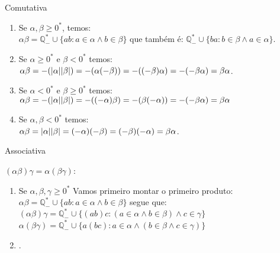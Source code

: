 \documentclass[../main.tex]{subfiles}
\begin{document}
\begin{prop}
    Comutativa
\end{prop}
\begin{dem}

    \begin{enumerate}
        \item Se $\alpha, \beta \geq 0^*$, temos: \\
        $\alpha \beta = \mathbb{Q}_{-}^* \cup \{ ab : a \in \alpha \land b \in \beta \}$ que também é:
        $\mathbb{Q}_{-}^* \cup \{ ba: b \in \beta \land a \in \alpha \}$.
    
    
        \item Se $\alpha \geq 0^*$ e $\beta < 0^*$ temos: \\
        $\alpha\beta = -(\abs{\alpha}\abs{\beta}) = -(\alpha(-\beta)) = -((-\beta)\alpha) = -(-\beta\alpha) = \beta\alpha$.
    
        \item Se $\alpha < 0^*$ e $\beta \geq 0^*$ temos: \\
            $\alpha\beta = -(\abs{\alpha}\abs{\beta}) = -((-\alpha)\beta) = -(\beta(-\alpha)) = -(-\beta\alpha) = \beta\alpha$
        
        \item Se $\alpha, \beta < 0^*$ temos: \\
        $\alpha \beta = \abs{\alpha}\abs{\beta} = (-\alpha)(-\beta) = (-\beta)(-\alpha) = \beta\alpha$.
    \end{enumerate}

    
\end{dem}

\begin{prop}
    Associativa
\end{prop}
\begin{dem}
    $(\alpha\beta)\gamma = \alpha(\beta\gamma)$: \\
    \begin{enumerate}
        \item Se $\alpha, \beta, \gamma \geq 0^*$ Vamos primeiro montar o primeiro produto:
        $\alpha\beta = \mathbb{Q}_{-}^* \cup \{ ab : a \in \alpha \land b \in \beta \}$ segue que: \\
        $(\alpha\beta)\gamma = \mathbb{Q}_{-}^* \cup \{ (ab)c : (a \in \alpha \land b \in \beta) \land c \in \gamma \}$ \\
        $\alpha(\beta\gamma) = \mathbb{Q}_{-}^* \cup \{ a(bc) : a \in \alpha \land (b \in \beta \land c \in \gamma) \}$

        \item .
    \end{enumerate}
\end{dem}

\end{document}
